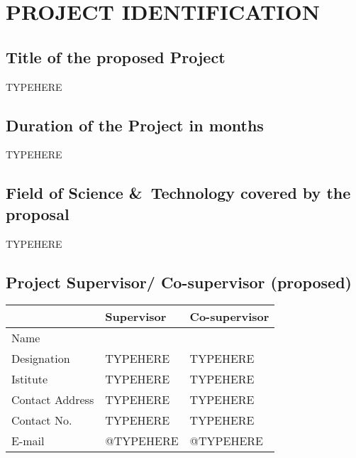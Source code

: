 \chapter{PROJECT IDENTIFICATION}

\section{Title of the proposed Project}

TYPEHERE

\section{Duration of the Project in months}

TYPEHERE

\section{Field of Science \&\ Technology covered by the proposal}

TYPEHERE

\section{Project Supervisor/ Co-supervisor (proposed)}

\begin{table}[H]
	\centering
\begin{tabular}{|l|l|l|}
	\hline
	{} & Supervisor & Co-supervisor \\
	\hline
	Name & \sup & \cosup \\
	Designation & TYPEHERE & TYPEHERE \\
	Istitute & TYPEHERE & TYPEHERE \\
	Contact Address & TYPEHERE & TYPEHERE \\
	Contact No. & TYPEHERE & TYPEHERE \\
	E-mail & @TYPEHERE & @TYPEHERE \\
	\hline
\end{tabular}
\end{table}


